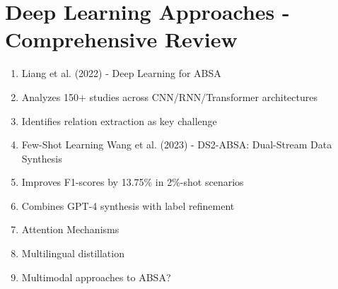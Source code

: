 \documentclass[]{article}
\begin{document}
\section{Deep Learning Approaches - Comprehensive Review}
\begin{enumerate}
\item[]  Liang et al. (2022) - Deep Learning for ABSA
\item Analyzes 150+ studies across CNN/RNN/Transformer architectures
\item Identifies relation extraction as key challenge
\item []  Few-Shot Learning Wang et al. (2023) - DS2-ABSA: Dual-Stream Data Synthesis
\item Improves F1-scores by 13.75\% in 2\%-shot scenarios
\item Combines GPT-4 synthesis with label refinement
\item Attention Mechanisms
\item  Multilingual distillation
\item  Multimodal approaches to ABSA?
\end{enumerate}
\end{document}
